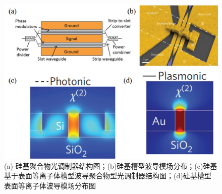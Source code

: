 \begin{figure}[htb]
	\centering
	\includegraphics[width=12cm]{./Pictures/fig_polymer_mod.jpg}
	\caption{ (a) 硅基聚合物光调制器结构图\cite{palmer2014high}；(b)硅基槽型波导模场分布\cite{palmer2014high}；(c)硅基基于表面等离子体槽型波导聚合物型光调制器结构图\cite{haffner2015all}；(d)硅基槽型表面等离子体波导模场分布图\cite{haffner2015all}}
	\label{fig_polymer_mod}
\end{figure}

